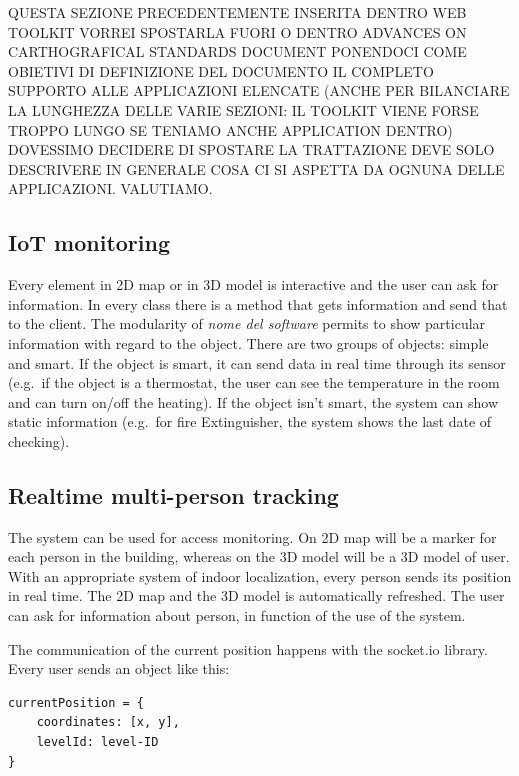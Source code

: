 \documentclass{sig-alternate}
\begin{document}
QUESTA SEZIONE PRECEDENTEMENTE INSERITA DENTRO WEB TOOLKIT VORREI
SPOSTARLA FUORI O DENTRO ADVANCES ON CARTHOGRAFICAL STANDARDS DOCUMENT
PONENDOCI COME OBIETIVI DI DEFINIZIONE DEL DOCUMENTO IL COMPLETO
SUPPORTO ALLE APPLICAZIONI ELENCATE (ANCHE PER BILANCIARE LA LUNGHEZZA
DELLE VARIE SEZIONI: IL TOOLKIT VIENE FORSE TROPPO LUNGO SE TENIAMO
ANCHE APPLICATION DENTRO) DOVESSIMO DECIDERE DI SPOSTARE LA TRATTAZIONE
DEVE SOLO DESCRIVERE IN GENERALE COSA CI SI ASPETTA DA OGNUNA DELLE
APPLICAZIONI. VALUTIAMO.

\subsection{IoT monitoring}\label{iot-monitoring}

Every element in 2D map or in 3D model is interactive and the user can
ask for information. In every class there is a method that gets
information and send that to the client. The modularity of \emph{nome
del software} permits to show particular information with regard to the
object. There are two groups of objects: simple and smart. If the object
is smart, it can send data in real time through its sensor (e.g.~if the
object is a thermostat, the user can see the temperature in the room and
can turn on/off the heating). If the object isn't smart, the system can
show static information (e.g.~for fire Extinguisher, the system shows
the last date of checking).

\subsection{Realtime multi-person
tracking}\label{realtime-multi-person-tracking}

The system can be used for access monitoring. On 2D map will be a marker
for each person in the building, whereas on the 3D model will be a 3D
model of user. With an appropriate system of indoor localization, every
person sends its position in real time. The 2D map and the 3D model is
automatically refreshed. The user can ask for information about person,
in function of the use of the system.

The communication of the current position happens with the socket.io
library. Every user sends an object like this:

\begin{verbatim}
currentPosition = {
    coordinates: [x, y],
    levelId: level-ID  
}
\end{verbatim}
\end{document}
